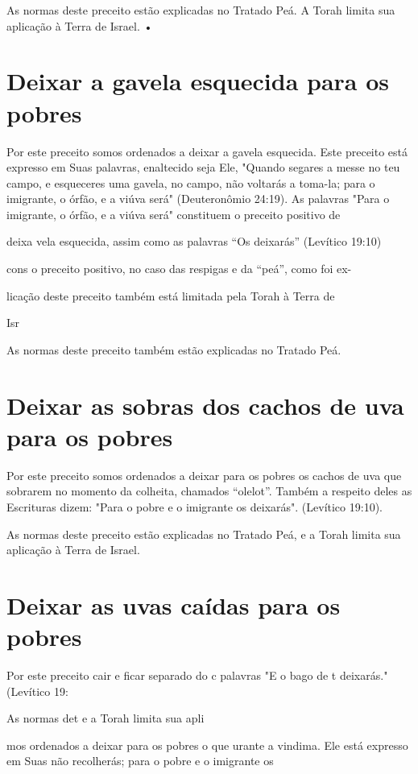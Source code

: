 As normas deste preceito estão explicadas no Tratado Peá. A Torah limita
sua aplicação à Terra de Israel. •

\section{Deixar a gavela esquecida para os pobres}

Por este preceito somos ordenados a deixar a gavela esquecida. Este
preceito está expresso em Suas palavras, enaltecido seja Ele, "Quando
segares a messe no teu campo, e esqueceres uma gavela, no campo, não
voltarás a toma-la; para o imigrante, o órfão, e a viúva será"
(Deuteronômio 24:19). As palavras "Para o imigrante, o órfão, e a viúva
será" constituem o preceito positivo de

deixa vela esquecida, assim como as palavras ``Os deixarás'' (Levítico
19:10)

cons o preceito positivo, no caso das respigas e da ``peá'', como foi ex-


licação deste preceito também está limitada pela Torah à Terra de

Isr

As normas deste preceito também estão explicadas no Tratado Peá.


\section{Deixar as sobras dos cachos de uva para os pobres}

Por este preceito somos ordenados a deixar para os pobres os ca­chos de
uva que sobrarem no momento da colheita, chamados ``olelot''. Tam­bém a
respeito deles as Escrituras dizem: "Para o pobre e o imigrante os
deixa­rás". (Levítico 19:10).

As normas deste preceito estão explicadas no Tratado Peá, e a Torah
limita sua aplicação à Terra de Israel.

\section{Deixar as uvas caídas para os pobres}


Por este preceito cair e ficar separado do c palavras "E o bago de t
deixarás." (Levítico 19:

As normas det e a Torah limita sua apli

mos ordenados a deixar para os pobres o que urante a vindima. Ele está
expresso em Suas não recolherás; para o pobre e o imigrante os

